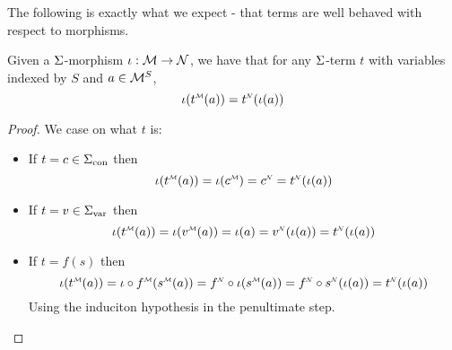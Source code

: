 The following is exactly what we expect - that terms are well behaved 
with respect to morphisms.
\begin{lem}
    Given a $\Sigma$-morphism $\iota : \mathcal{M} \to \mathcal{N}$, 
    we have that for any $\Sigma$-term $t$ with variables indexed by $S$ and 
    $a \in \mathcal{M}^S$,
    \[\io(\mmintp{t}(a)) = \nnintp{t}(\io(a))\]
\end{lem}
\begin{proof}
    We case on what $t$ is:
    \begin{itemize}
        \item If $t = c \in {\Sigma}_\mathrm{con}$ then 
            \[
                \io(\mmintp{t}(a)) = \io(\mmintp{c}) = 
                \nnintp{c} = \nnintp{t}(\io(a))
            \]
        \item If $t = v \in {\Sigma}_\mathrm{var}$ then 
            \[
                \io(\mmintp{t}(a)) =
                \io(\mmintp{v}(a)) = \io(a) = 
                \nnintp{v}(\io(a)) = \nnintp{t}(\io(a))
            \]
        \item If $t = f(s)$ then
            \[
                \io(\mmintp{t}(a)) = \io \circ \mmintp{f}(\mmintp{s}(a)) = 
                \nnintp{f} \circ \io(\mmintp{s}(a)) = 
                \nnintp{f} \circ \nnintp{s}(\io(a)) =
                \nnintp{t}(\io(a))
            \]
            Using the induciton hypothesis in the penultimate step.
    \end{itemize}
\end{proof}

